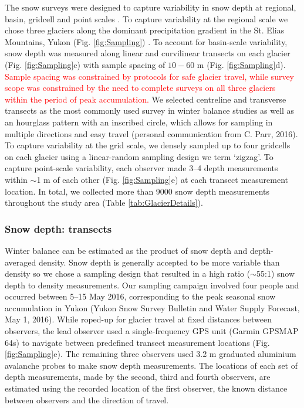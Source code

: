\documentclass[review,oneside, letterpaper]{igs}
\begin{document}
The snow surveys were designed to capture variability in snow depth at regional, basin, gridcell and point scales \citep{Clark2011}. To capture variability at the regional scale we chose three glaciers along the dominant precipitation gradient in the St. Elias Mountains, Yukon (Fig. \ref{fig:Sampling}) \citep{Taylor1969}. To account for basin-scale variability, snow depth was measured along linear and curvilinear transects on each glacier (Fig. \ref{fig:Sampling}c) with sample spacing of $10-60$ m (Fig. \ref{fig:Sampling}d). \textcolor{red}{Sample spacing was constrained by protocols for safe glacier travel, while survey scope was constrained by the need to complete surveys on all three glaciers within the period of peak accumulation.} We selected centreline and transverse transects as the most commonly used survey in winter balance studies \citep[e.g.][]{Kaser2003, Machguth2006} as well as an hourglass pattern with an inscribed circle, which allows for sampling in multiple directions and easy travel (personal communication from C. Parr, 2016). To capture variability at the grid scale, we densely sampled up to four gridcells on each glacier using a linear-random sampling design we term `zigzag'. To capture point-scale variability, each observer made 3--4 depth measurements within $\sim$1 m of each other (Fig. \ref{fig:Sampling}e) at each transect measurement location. In total, we collected more than 9000 snow depth measurements throughout the study area (Table \ref {tab:GlacierDetails}). 

\subsubsection{Snow depth: transects}

Winter balance can be estimated as the product of snow depth and depth-averaged density. Snow depth is generally accepted to be more variable than density \citep{Elder1991, Clark2011, Lopez2013} so we chose a sampling design that resulted in a high ratio ($\sim$55:1) snow depth to density measurements. Our sampling campaign involved four people and occurred between 5--15 May 2016, corresponding to the peak seasonal snow accumulation in Yukon (Yukon Snow Survey Bulletin and Water Supply Forecast, May 1, 2016). While roped-up for glacier travel at fixed distances between observers, the lead observer used a single-frequency GPS unit (Garmin GPSMAP 64s) to navigate between predefined transect measurement locations (Fig. \ref{fig:Sampling}e). The remaining three observers used 3.2 m graduated aluminium avalanche probes to make snow depth measurements. The locations of each set of depth measurements, made by the second, third and fourth observers, are estimated using the recorded location of the first observer, the known distance between observers and the direction of travel. 
\end{document}
